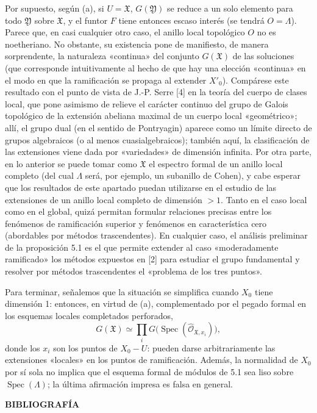 \documentclass[11pt,twoside,openany]{book}
\numberwithin{equation}{section}
\newcommand{\src}[1]{%
  \phantomsection\hypertarget{src:#1}{}%
  \marginpar{\raggedleft\footnotesize\sffamily #1}%
}
\theoremstyle{plain}
\theoremstyle{definition}
\theoremstyle{remark}
\newcommand{\FgaUnitKey}{frontmatter}
\renewcommand{\src}[1]{%
  \phantomsection\hypertarget{src:\FgaUnitKey:#1}{}%
  \marginpar{\raggedleft\footnotesize\sffamily #1}%
}
\theoremstyle{plain}
\theoremstyle{definition}
\theoremstyle{remark}
\begin{document}
Por supuesto, según (a), si $U=\mathfrak X$, $G(\mathfrak Y)$ se reduce a un
solo elemento para todo $\mathfrak Y$ sobre $\mathfrak X$, y el funtor $F$
tiene entonces escaso interés (se tendrá $O=\Lambda$). Parece que, en casi
cualquier otro caso, el anillo local topológico $O$ no es noetheriano. No
obstante, su existencia pone de manifiesto, de manera sorprendente, la
naturaleza «continua» del conjunto $G(\mathfrak X)$ de las soluciones (que
corresponde intuitivamente al hecho de que hay una elección «continua» en el
modo en que la ramificación se propaga al extender $X'_0$). Compárese este
resultado con el punto de vista de J.-P. Serre [4] en la teoría del cuerpo de
clases local, que pone asimismo de relieve el carácter continuo del grupo de
Galois topológico de la extensión abeliana maximal de un cuerpo local
«geométrico»; allí, el grupo dual (en el sentido de Pontryagin) aparece como un
límite directo de grupos algebraicos (o al menos cuasialgebraicos); también
aquí, la clasificación de las extensiones viene dada por «variedades» de
dimensión infinita. Por otra parte, en lo anterior se puede tomar como
$\mathfrak X$ el espectro formal de un anillo local completo (del cual
$\Lambda$ será, por ejemplo, un subanillo de Cohen), y cabe esperar que los
resultados de este apartado puedan utilizarse en el estudio de las extensiones
de un anillo local completo de dimensión $>1$. Tanto en el caso local como en
el global, quizá permitan formular relaciones precisas entre los fenómenos de
ramificación superior y fenómenos en característica cero (abordables por
métodos trascendentes). En cualquier caso, el análisis preliminar de la
proposición 5.1 es el que permite extender al caso «moderadamente ramificado»
los métodos expuestos en [2] para estudiar el grupo fundamental y resolver por
métodos trascendentes el «problema de los tres puntos».

Para terminar, señalemos que la situación se simplifica cuando $X_0$ tiene dimensión 1: entonces, en virtud de (a), complementado por el pegado formal en los esquemas locales completados perforados,
\[
  G(\mathfrak X)\simeq
  \prod_iG\bigl(\operatorname{Spec}(\widehat{\mathcal O}_{\mathfrak X,x_i})\bigr),
\]
donde los $x_i$ son los puntos de $X_0-U$: pueden darse arbitrariamente las
extensiones «locales» en los puntos de ramificación. Además, la normalidad de $X_0$ por sí sola no implica que el esquema formal de módulos de 5.1 sea liso sobre $\operatorname{Spec}(\Lambda)$; la última afirmación impresa es falsa en general.

\src{390}
\begin{center}
  \textbf{BIBLIOGRAFÍA}
\end{center}
\end{document}
